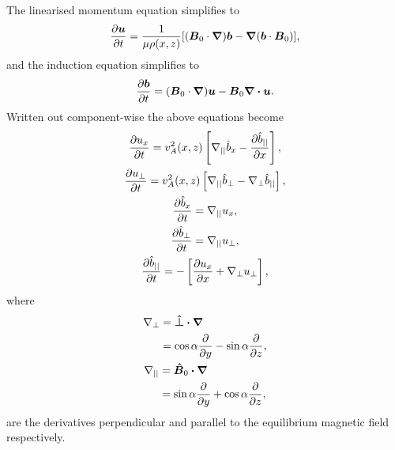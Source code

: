 The linearised momentum equation simplifies to
\begin{equation}
    \label{eq:chap_4_linearised_momentum_eqn}
    \begin{aligned}
        \pdv{\boldsymbol{u}}{t}=\frac{1}{\mu\rho(x,z)}\qty[(\boldsymbol{B}_0\cdot\grad)\boldsymbol{b} - \grad\qty(\boldsymbol{b}\cdot\boldsymbol{B}_0)],
    \end{aligned}
\end{equation}
and the induction equation simplifies to
\begin{equation}
    \label{eq:chap_4_linearised_induction_eqn}
    \begin{aligned}
    \pdv{\boldsymbol{b}}{t}=(\boldsymbol{B}_0\cdot\grad)\boldsymbol{u} - \boldsymbol{B}_0\div{\boldsymbol{u}}.
    \end{aligned}
\end{equation}
Written out component-wise the above equations become
\begin{gather}
    \label{eq:chap_4_ux_eqn1}
    \pdv{u_x}{t}=v_A^2(x,z)\left[\nabla_{||}\hat{b}_x - \pdv{\hat{b}_{||}}{x}\right],\\
    \label{eq:chap_4_u_perp_eqn1}
    \pdv{u_\perp}{t}=v_A^2(x,z)\left[\nabla_{||}\hat{b}_\perp-\nabla_\perp \hat{b}_{||}\right],\\
    \label{eq:chap_4_bx_eqn1}
    \pdv{\hat{b}_x}{t}=\nabla_{||}u_x,\\
    \label{eq:chap_4_b_perp_eqn1}
    \pdv{\hat{b}_\perp}{t}=\nabla_{||}u_{\perp},\\
    \label{eq:chap_4_b_par_eqn1}
    \pdv{\hat{b}_{||}}{t}=-\left[\pdv{u_x}{x}+\nabla_\perp u_{\perp}\right],
\end{gather}
where
\begin{gather}
    \label{eq:nabla_perp}
    \begin{aligned}
    \nabla_\perp &= \vec{\hat{\perp}}\vdot\grad \\
    &= \cos\alpha\pdv{}{y}-\sin\alpha\pdv{}{z},
    \end{aligned} \\
    \label{eq:nabla_par}
    \begin{aligned}
    \nabla_{||} &= \vec{\hat{B}}_0\vdot\grad \\
    &= \sin\alpha\pdv{}{y}+\cos\alpha\pdv{}{z},
    \end{aligned}
\end{gather}
are the derivatives perpendicular and parallel to the
equilibrium magnetic field respectively.

